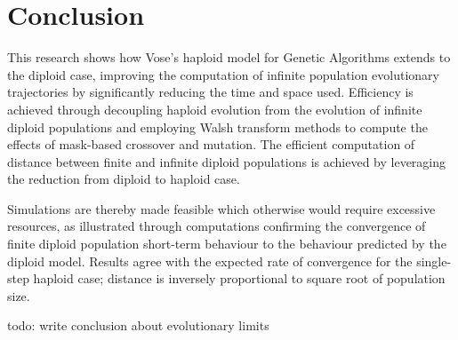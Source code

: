 \chapter{Conclusion}
This research shows how Vose's haploid model for Genetic Algorithms
extends to the diploid case, improving the computation of infinite
population evolutionary trajectories by significantly reducing the
time and space used.  Efficiency is achieved through decoupling
haploid evolution from the evolution of infinite diploid populations
and employing Walsh transform methods to compute the effects of
mask-based crossover and mutation.  The efficient computation of
distance between finite and infinite diploid populations is achieved
by leveraging the reduction from diploid to haploid case.

Simulations are thereby made feasible which otherwise would require
excessive resources, as illustrated through computations confirming
the convergence of finite diploid population short-term behaviour to
the behaviour predicted by the diploid model. Results agree with the
expected rate of convergence for the single-step haploid case;
distance is inversely proportional to square root of population size.



todo: write conclusion about evolutionary limits


